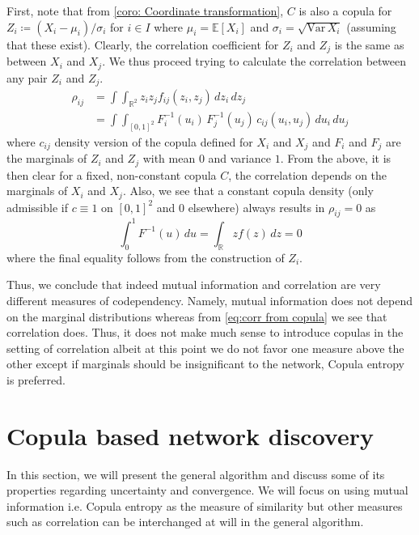 \documentclass[../Thesis.tex]{subfiles}
\begin{document}
First, note that from \autoref{coro: Coordinate transformation}, $C$ is also a copula for $Z_i \coloneq \left( X_i - \mu_i\right) / \sigma_i$ for $i \in I$ where $\mu_i = \mathbb{E}[X_i]$ and $\sigma_i = \sqrt{\text{Var} \, X_i}$ (assuming that these exist). Clearly, the correlation coefficient for $Z_i$ and $Z_j$ is the same as between $X_i$ and $X_j$. We thus proceed trying to calculate the correlation between any pair $Z_i$ and $Z_j$.
\begin{equation}\label{eq:corr from copula}
    \begin{split}
        \rho_{ij} & = \int\int_{\mathbb{R}^2} z_i z_j f_{ij}(z_i,z_j) \, dz_i \, dz_j                       \\
                  & = \int\int_{[0,1]^2} F_i^{-1}(u_i) \, F_j^{-1}(u_j) \, c_{ij}(u_i, u_j) \, du_i \, du_j
    \end{split}
\end{equation}
where $c_{ij}$ density version of the copula defined for $X_i$ and $X_j$ and $F_i$ and $F_j$ are the marginals of $Z_i$ and $Z_j$ with mean $0$ and variance $1$. From the above, it is then clear for a fixed, non-constant copula $C$, the correlation depends on the marginals of $X_i$ and $X_j$. Also, we see that a constant copula density (only admissible if $c \equiv 1$ on $[0,1]^2$ and $0$ elsewhere) always results in $\rho_{ij} = 0$ as
$$\int_0^1 F^{-1}(u) \, du = \int_{\mathbb{R}} z f(z) \, dz = 0$$
where the final equality follows from the construction of $Z_i$.

Thus, we conclude that indeed mutual information and correlation are very different measures of codependency. Namely, mutual information does not depend on the marginal distributions whereas from \autoref{eq:corr from copula} we see that correlation does. Thus, it does not make much sense to introduce copulas in the setting of correlation albeit at this point we do not favor one measure above the other except if marginals should be insignificant to the network, Copula entropy is preferred.






\section{Copula based network discovery}\label{sec:Copula based network discovery}
In this section, we will present the general algorithm and discuss some of its properties regarding uncertainty and convergence. We will focus on using mutual information i.e. Copula entropy as the measure of similarity but other measures such as correlation can be interchanged at will in the general algorithm.
\end{document}
